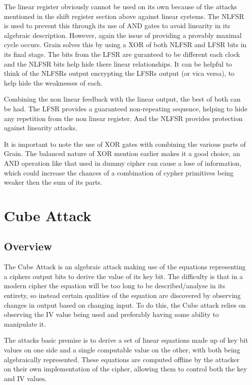 \documentclass{report}
\let\Oldsection\section
\renewcommand{\section}{\FloatBarrier\Oldsection}
\begin{document}
The linear register obviously cannot be used on its own because of the attacks mentioned in the shift register section above against linear systems. The NLFSR is used to prevent this through its use of AND gates to avoid linearity in its algebraic description. However, again the issue of providing a provably maximal cycle occurs. Grain solves this by using a XOR of both NLFSR and LFSR bits in its final stage. The bits from the LFSR are guranteed to be different each clock and the NLFSR bits help hide there linear relationships. It can be helpful to think of the NLFSRs output encrypting the LFSRs output (or vica versa), to help hide the weaknesses of each.

Combining the non linear feedback with the linear output, the best of both can be had. The LFSR provides a guaranteed non-repeating sequence, helping to hide any repetition from the non linear register. And the NLFSR provides protection against linearity attacks.

It is important to note the use of XOR gates with combining the various parts of Grain. The balanced nature of XOR mention earlier makes it a good choice, an AND operation like that used in dummy cipher can cause a lose of information, which could increase the chances of a combination of cypher primitives being weaker then the sum of its parts.


\chapter{Cube Attack}
\section{Overview}
The Cube Attack is an algebraic attack making use of the equations representing a ciphers output bits to derive the value of its key bit. The difficulty is that in a modern cipher the equation will be too long to be described/analyse in its entirety, so instead certain qualities of the equation are discovered by observing changes in output based on changing input. To do this, the Cube attack relies on observing the IV value being used and preferably having some ability to manipulate it.

The attacks basic premise is to derive a set of linear equations made up of key bit values on one side and a single computable value on the other, with both being algebraically represented. These equations are computed offline by the attacker on their own implementation of the cipher, allowing them to control both the key and IV values.
\end{document}
